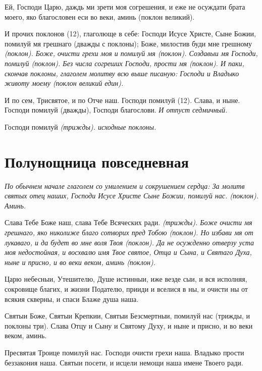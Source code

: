 Ей, Господи Царю, даждь ми зрети моя согрешения, и еже не осуждати брата моего, яко благословен еси во веки, аминь (поклон великий).


И прочих поклонов (12), глаголюще в себе: Господи Исусе Христе, Сыне Божии, помилуй мя грешнаго (дважды с поклоны); Боже, милостив буди мне грешному \itshape (поклон)\normalfont{}. Боже, очисти грехи моя и помилуй мя \itshape (поклон)\normalfont{}. Создавыи мя Господи, помилуй \itshape (поклон)\normalfont{}. Без числа согреших Господи, прости мя \itshape (поклон)\normalfont{}. И паки, скончав поклоны, глаголем молитву всю выше писаную: Господи и Владыко животу моему (поклон великий един).


И по сем, Трисвятое, и по Отче наш. Господи помилуй (12). Слава, и ныне. Господи помилуй (дважды), Господи благослови. \itshape И отпуст седмичный.\normalfont{}


Господи помилуй \itshape (трижды)\normalfont{}. исходные поклоны.




\section{Полунощница повседневная}
 


\itshape По обычнем начале глаголем со умилением и сокрушением сердца:\normalfont{} За молитв святых отец наших, Господи Исусе Христе Сыне Божии, помилуй нас. \itshape (поклон)\normalfont{}. Аминь.


Слава Тебе Боже наш, слава Тебе Всяческих ради. \itshape (трижды)\normalfont{}. Боже очисти мя грешнаго, яко николиже благо сотворих пред Тобою \itshape (поклон)\normalfont{}. Но избави мя от лукаваго, и да будет во мне воля Твоя \itshape (поклон)\normalfont{}. Да не осужденно отверзу уста моя недостойная, и восхвалю имя Твое святое, Отца и Сына, и Святаго Духа, ныне и присно, и во веки веком, аминь \itshape (поклон)\normalfont{}.


Царю небесныи, Утешителю, Душе истинныи, иже везде сыи, и вся исполняя, сокровище благих, и жизни Подателю, прииди и вселися в ны, и очисти ны от всякия скверны, и спаси Блаже душа наша.


Святыи Боже, Святыи Крепкии, Святыи Безсмертныи, помилуй нас (трижды, и поклоны три). Слава Отцу и Сыну и Святому Духу, и ныне и присно, и во веки веком, аминь.


Пресвятая Троице помилуй нас. Господи очисти грехи наша. Владыко прости беззакония наша. Святыи посети, и исцели немощи наша имене Твоего ради.


